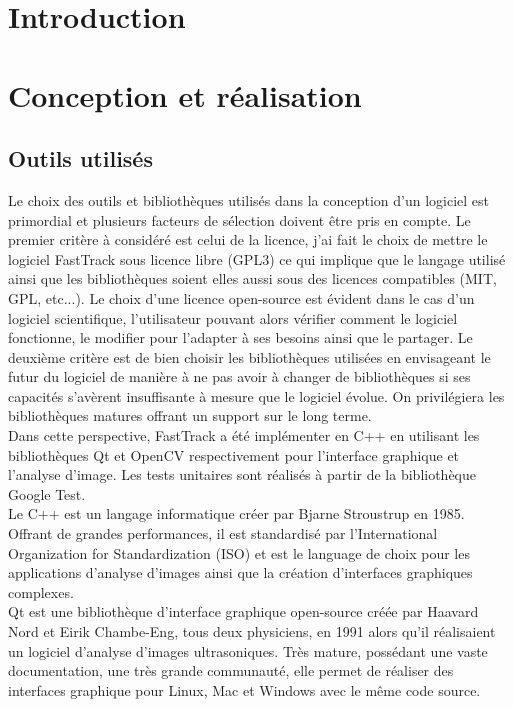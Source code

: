 \chapter{Introduction}


\chapter{Conception et réalisation}

	\section{Outils utilisés}
	
	Le choix des outils et bibliothèques utilisés dans la conception d'un logiciel est primordial et plusieurs facteurs de sélection doivent être pris en compte.
	Le premier critère à considéré est celui de la licence, j'ai fait le choix de mettre le logiciel FastTrack sous licence libre (GPL3) ce qui implique que le langage utilisé ainsi que les bibliothèques soient elles aussi sous des licences compatibles (MIT, GPL, etc...). Le choix d'une licence open-source est évident dans le cas d'un logiciel scientifique, l'utilisateur pouvant alors vérifier comment le logiciel fonctionne, le modifier pour l'adapter à ses besoins ainsi que le partager.
	Le deuxième critère est de bien choisir les bibliothèques utilisées en envisageant le futur du logiciel de manière à ne pas avoir à changer de bibliothèques si ses capacités s'avèrent insuffisante à mesure que le logiciel évolue. On privilégiera les bibliothèques matures offrant un support sur le long terme.\\
	
	Dans cette perspective, FastTrack a été implémenter en C++ en utilisant les bibliothèques Qt et OpenCV respectivement pour l'interface graphique et l'analyse d'image. Les tests unitaires sont réalisés à partir de la bibliothèque Google Test.\\
	
	Le C++ est un langage informatique créer par Bjarne Stroustrup en 1985. Offrant de grandes performances, il est standardisé par l'International Organization for Standardization (ISO) et est le language de choix pour les applications d'analyse d'images ainsi que la création d'interfaces graphiques complexes.\\
	
	Qt est une bibliothèque d'interface graphique open-source créée par Haavard Nord et Eirik Chambe-Eng, tous deux physiciens, en 1991 alors qu'il réalisaient un logiciel d'analyse d'images ultrasoniques. Très mature, possédant une vaste documentation, une très grande communauté, elle permet de réaliser des interfaces graphique pour Linux, Mac et Windows avec le même code source.\\
	
